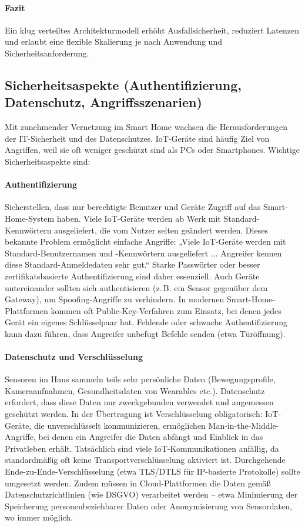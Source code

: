 \paragraph{Fazit} 
Ein klug verteiltes Architekturmodell erhöht Ausfallsicherheit, reduziert Latenzen und erlaubt eine flexible Skalierung je nach Anwendung und Sicherheitsanforderung. \autocite{edge_fog_cloud} 
\\
\subsection*{Sicherheitsaspekte (Authentifizierung, Datenschutz, Angriffsszenarien)}
Mit zunehmender Vernetzung im Smart Home wachsen die Herausforderungen der IT-Sicherheit und des Datenschutzes. IoT-Geräte sind häufig Ziel von Angriffen, weil sie oft weniger geschützt sind als PCs oder Smartphones. Wichtige Sicherheitsaspekte sind:
\\
\paragraph{Authentifizierung}
Sicherstellen, dass nur berechtigte Benutzer und Geräte Zugriff auf das Smart-Home-System haben. Viele IoT-Geräte werden ab Werk mit Standard-Kennwörtern ausgeliefert, die vom Nutzer selten geändert werden. Dieses bekannte Problem ermöglicht einfache Angriffe: „Viele IoT-Geräte werden mit Standard-Benutzernamen und -Kennwörtern ausgeliefert ... Angreifer kennen diese Standard-Anmeldedaten sehr gut.“ Starke Passwörter oder besser zertifikatsbasierte Authentifizierung sind daher essenziell. Auch Geräte untereinander sollten sich authentisieren (z.\,B. ein Sensor gegenüber dem Gateway), um Spoofing-Angriffe zu verhindern. In modernen Smart-Home-Plattformen kommen oft Public-Key-Verfahren zum Einsatz, bei denen jedes Gerät ein eigenes Schlüsselpaar hat. Fehlende oder schwache Authentifizierung kann dazu führen, dass Angreifer unbefugt Befehle senden (etwa Türöffnung). \autocite{cloudflare}
\\
\paragraph{Datenschutz und Verschlüsselung}
Sensoren im Haus sammeln teils sehr persönliche Daten (Bewegungsprofile, Kameraaufnahmen, Gesundheitsdaten von Wearables etc.). Datenschutz erfordert, dass diese Daten nur zweckgebunden verwendet und angemessen geschützt werden. In der Übertragung ist Verschlüsselung obligatorisch: IoT-Geräte, die unverschlüsselt kommunizieren, ermöglichen Man-in-the-Middle-Angriffe, bei denen ein Angreifer die Daten abfängt und Einblick in das Privatleben erhält. Tatsächlich sind viele IoT-Kommunikationen anfällig, da standardmäßig oft keine Transportverschlüsselung aktiviert ist. Durchgehende Ende-zu-Ende-Verschlüsselung (etwa TLS/DTLS für IP-basierte Protokolle) sollte umgesetzt werden. Zudem müssen in Cloud-Plattformen die Daten gemäß Datenschutzrichtlinien (wie DSGVO) verarbeitet werden – etwa Minimierung der Speicherung personenbeziehbarer Daten oder Anonymisierung von Sensordaten, wo immer möglich. \autocite{cloudflare}
\\
